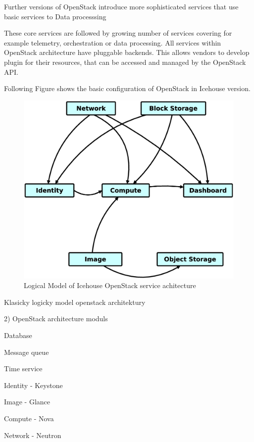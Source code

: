 Further versions of OpenStack introduce more sophisticated services that use basic services to Data processsing 

 These core services are followed by growing number of services covering for example telemetry, orchestration or data processing. All services within OpenStack architecture have pluggable backends. This allows vendors to develop plugin for their resources, that can be accessed and managed by the OpenStack API.

Following Figure shows the basic configuration of OpenStack in Icehouse version.

\begin{figure}[!h]
\centering
\includegraphics[scale=.2]{img/openstack_logical_model.eps}
\caption{Logical Model of Icehouse OpenStack service achitecture}
\label{fig:cm}
\end{figure}


Klasicky logicky model openstack architektury

2) OpenStack architecture moduls


Database

Message queue

Time service

Identity - Keystone

Image - Glance

Compute - Nova

Network - Neutron

